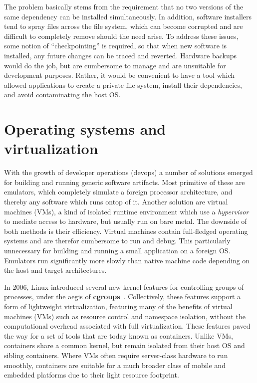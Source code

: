 \documentclass[12pt,initial,twoside,maitrise]{dms}
\numberwithin{equation}{section}
\numberwithin{table}{chapter}
\numberwithin{figure}{chapter}
\begin{document}
The problem basically stems from the requirement that no two versions of the same dependency can be installed simultaneously. In addition, software installers tend to spray files across the file system, which can become corrupted and are difficult to completely remove should the need arise. To address these issues, some notion of ``checkpointing'' is required, so that when new software is installed, any future changes can be traced and reverted. Hardware backups would do the job, but are cumbersome to manage and are unsuitable for development purposes. Rather, it would be convenient to have a tool which allowed applications to create a private file system, install their dependencies, and avoid contaminating the host OS.

\section{Operating systems and virtualization}\label{sec:os-and-virtualization}

With the growth of developer operations (devops) a number of solutions emerged for building and running generic software artifacts. Most primitive of these are emulators, which completely simulate a foreign processor architecture, and thereby any software which runs ontop of it. Another solution are virtual machines (VMs), a kind of isolated runtime environment which use a \textit{hypervisor} to mediate access to hardware, but usually run on bare metal. The downside of both methods is their efficiency. Virtual machines contain full-fledged operating systems and are therefor cumbersome to run and debug. This particularly unnecessary for building and running a small application on a foreign OS. Emulators run significantly more slowly than native machine code depending on the host and target architectures.

In 2006, Linux introduced several new kernel features for controlling groups of processes, under the aegis of \textbf{cgroups}~\citep{menage2007adding}. Collectively, these features support a form of lightweight virtualization, featuring many of the benefits of virtual machines (VMs) such as resource control and namespace isolation, without the computational overhead associated with full virtualization. These features paved the way for a set of tools that are today known as containers. Unlike VMs, containers share a common kernel, but remain isolated from their host OS and sibling containers. Where VMs often require server-class hardware to run smoothly, containers are suitable for a much broader class of mobile and embedded platforms due to their light resource footprint.
\end{document}
